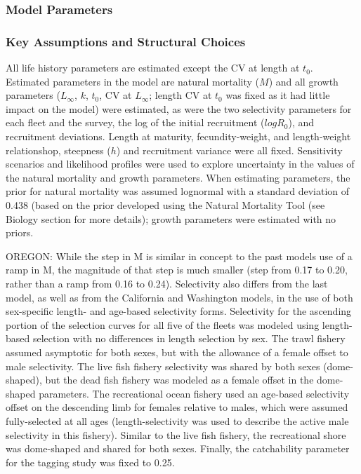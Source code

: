 \documentclass[11pt,
  english,
  letterpaper,
]{article}
\begin{document}
\hypertarget{model-parameters}{%
\subsubsection{Model Parameters}\label{model-parameters}}

\hypertarget{key-assumptions-and-structural-choices}{%
\subsubsection{Key Assumptions and Structural Choices}\label{key-assumptions-and-structural-choices}}

All life history parameters are estimated except the CV at length at \(t_0\). Estimated parameters in the model are natural mortality (\(M\)) and all growth parameters (\(L_{\infty}\), \(k\), \(t_0\), CV at \(L_{\infty}\); length CV at \(t_0\) was fixed as it had little impact on the model) were estimated, as were the two selectivity parameters for each fleet and the survey, the log of the initial recruitment (\(logR_0\)), and recruitment deviations. Length at maturity, fecundity-weight, and length-weight relationshop, steepness (\(h\)) and recruitment variance were all fixed. Sensitivity scenarios and likelihood profiles were used to explore uncertainty in the values of the natural mortality and growth parameters. When estimating parameters, the prior for natural mortality was assumed lognormal with a standard deviation of 0.438 (based on the prior developed using the Natural Mortality Tool (see Biology section for more details); growth parameters were estimated with no priors.

OREGON: While the step in M is similar in concept to the past models use of a ramp in M, the magnitude of that step is much smaller (step from 0.17 to 0.20, rather than a ramp from 0.16 to 0.24). Selectivity also differs from the last model, as well as from the California and Washington models, in the use of both sex-specific length- and age-based selectivity forms. Selectivity for the ascending portion of the selection curves for all five of the fleets was modeled using length-based selection with no differences in length selection by sex. The trawl fishery assumed asymptotic for both sexes, but with the allowance of a female offset to male selectivity. The live fish fishery selectivity was shared by both sexes (dome-shaped), but the dead fish fishery was modeled as a female offset in the dome-shaped parameters. The recreational ocean fishery used an age-based selectivity offset on the descending limb for females relative to males, which were assumed fully-selected at all ages (length-selectivity was used to describe the active male selectivity in this fishery). Similar to the live fish fishery, the recreational shore was dome-shaped and shared for both sexes. Finally, the catchability parameter for the tagging study was fixed to 0.25.
\end{document}
